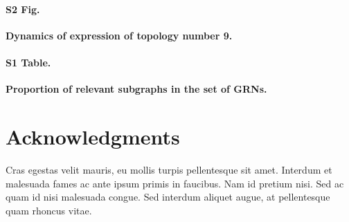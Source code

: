 \documentclass[10pt,letterpaper]{article}
\begin{document}
\paragraph*{S2 Fig.}
\label{S2_Fig}
{\bf Dynamics of expression of topology number 9.}

% 
% 

\paragraph*{S1 Table.}
\label{S1_Table}
{\bf Proportion of relevant subgraphs in the set of GRNs.}

\section*{Acknowledgments}
Cras egestas velit mauris, eu mollis turpis pellentesque sit amet. Interdum et malesuada fames ac ante ipsum primis in faucibus. Nam id pretium nisi. Sed ac quam id nisi malesuada congue. Sed interdum aliquet augue, at pellentesque quam rhoncus vitae.

\nolinenumbers
\end{document}
